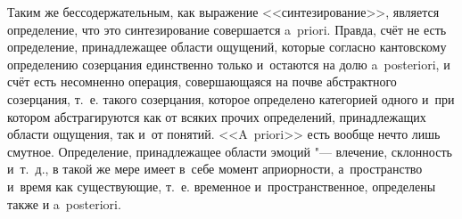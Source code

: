 Таким же бессодержательным, как выражение <<синтезирование>>, является
определение, что это синтезирование совершается a~priori. Правда, счёт не
есть определение, принадлежащее области ощущений, которые согласно кантовскому
определению созерцания единственно только и~остаются на долю a~poste\-riori, и
счёт есть несомненно операция, совершающаяся на почве абстрактного
созерцания, т.~е. такого созерцания, которое определено категорией одного и~при
котором абстрагируются как от всяких прочих определений, принадлежащих области
ощущения, так и~от понятий. <<A~priori>> есть вообще нечто лишь смутное.
Определение, принадлежащее области эмоций "--- влечение, склонность и~т.~д.,
в такой же мере имеет в~себе момент априорности, а~пространство и~время как
существующие, т.~е. временное и~пространственное, определены также и
a~poste\-ri\-ori.

